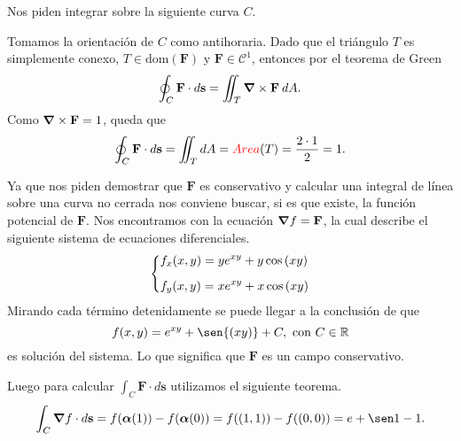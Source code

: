 
\begin{solution}
    Nos piden integrar sobre la siguiente curva $C$.

    \begin{center}
    \end{center}

    Tomamos la orientaci\'on de $C$ como antihoraria.
    Dado que el tri\'angulo $T$  es simplemente conexo,   $T
        \in \text{dom}(\mathbf{F})$ y $\mathbf{F}\in \mathcal{C}^1$, entonces
    por el teorema de Green
    \[
        \oint_C \mathbf{F}\cdot d\mathbf{s} = \iint_T
        \grad\times\mathbf{F}\:dA.
    \]
    Como $\grad\times\mathbf{F} = 1$, queda que \[\oint_C
        \mathbf{F}\cdot d\mathbf{s} = \iint_T dA = \textcolor{red}{Area}(T)
        = \frac{2\cdot1}{2} = 1.\]
\end{solution}


\begin{solution}
    Ya que nos piden demostrar que $\mathbf{F}$ es conservativo
    y calcular una integral de l\'inea sobre una curva no
    cerrada nos conviene buscar, si es que existe, la funci\'on
    potencial de $\mathbf{F}$. Nos encontramos con la ecuaci\'on
    $\grad f = \mathbf{F}$, la cual describe el siguiente
    sistema de ecuaciones diferenciales.
    \[
        \begin{dcases}
            f_x(x,y) = ye^{xy} + y \cos{(xy)} \\[.2cm]
            f_y(x,y) = xe^{xy} + x \cos{(xy)}
        \end{dcases}
    \]
    Mirando cada t\'ermino detenidamente se puede llegar a
    la conclusi\'on de que $$f(x,y) = e^{xy} + \sen{(xy)} + C,
        \mbox{ con } C\in\R$$ es soluci\'on del sistema. Lo que
    significa que $\mathbf{F}$ es un campo conservativo.

    Luego para calcular $\int_C \mathbf{F}\cdot d\mathbf{s}$
    utilizamos el siguiente teorema.
    \[
        \int_C \grad f\cdot d\mathbf{s} =
        f(\boldsymbol{\alpha}(1)) - f(\boldsymbol{\alpha}(0)) =
        f((1,1)) - f((0,0)) = e + \sen1 - 1.
    \]
\end{solution}


